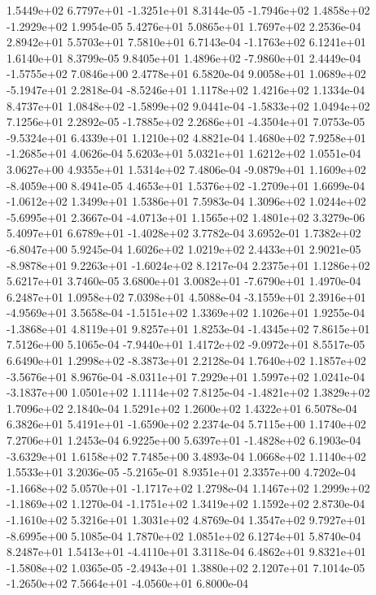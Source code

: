  1.5449e+02  6.7797e+01 -1.3251e+01  8.3144e-05
-1.7946e+02  1.4858e+02 -1.2929e+02  1.9954e-05
5.4276e+01 5.0865e+01 1.7697e+02  2.2536e-04
2.8942e+01 5.5703e+01 7.5810e+01  6.7143e-04
-1.1763e+02  6.1241e+01  1.6140e+01  8.3799e-05
 9.8405e+01  1.4896e+02 -7.9860e+01  2.4449e-04
-1.5755e+02  7.0846e+00  2.4778e+01  6.5820e-04
 9.0058e+01  1.0689e+02 -5.1947e+01  2.2818e-04
-8.5246e+01  1.1178e+02  1.4216e+02  1.1334e-04
 8.4737e+01  1.0848e+02 -1.5899e+02  9.0441e-04
-1.5833e+02  1.0494e+02  7.1256e+01  2.2892e-05
-1.7885e+02  2.2686e+01 -4.3504e+01  7.0753e-05
-9.5324e+01  6.4339e+01  1.1210e+02  4.8821e-04
 1.4680e+02  7.9258e+01 -1.2685e+01  4.0626e-04
5.6203e+01 5.0321e+01 1.6212e+02  1.0551e-04
3.0627e+00 4.9355e+01 1.5314e+02  7.4806e-04
-9.0879e+01  1.1609e+02 -8.4059e+00  8.4941e-05
 4.4653e+01  1.5376e+02 -1.2709e+01  1.6699e-04
-1.0612e+02  1.3499e+01  1.5386e+01  7.5983e-04
 1.3096e+02  1.0244e+02 -5.6995e+01  2.3667e-04
-4.0713e+01  1.1565e+02  1.4801e+02  3.3279e-06
 5.4097e+01  6.6789e+01 -1.4028e+02  3.7782e-04
 3.6952e-01  1.7382e+02 -6.8047e+00  5.9245e-04
1.6026e+02 1.0219e+02 2.4433e+01  2.9021e-05
-8.9878e+01  9.2263e+01 -1.6024e+02  8.1217e-04
2.2375e+01 1.1286e+02 5.6217e+01  3.7460e-05
 3.6800e+01  3.0082e+01 -7.6790e+01  1.4970e-04
6.2487e+01 1.0958e+02 7.0398e+01  4.5088e-04
-3.1559e+01  2.3916e+01 -4.9569e+01  3.5658e-04
-1.5151e+02  1.3369e+02  1.1026e+01  1.9255e-04
-1.3868e+01  4.8119e+01  9.8257e+01  1.8253e-04
-1.4345e+02  7.8615e+01  7.5126e+00  5.1065e-04
-7.9440e+01  1.4172e+02 -9.0972e+01  8.5517e-05
 6.6490e+01  1.2998e+02 -8.3873e+01  2.2128e-04
 1.7640e+02  1.1857e+02 -3.5676e+01  8.9676e-04
-8.0311e+01  7.2929e+01  1.5997e+02  1.0241e-04
-3.1837e+00  1.0501e+02  1.1114e+02  7.8125e-04
-1.4821e+02  1.3829e+02  1.7096e+02  2.1840e-04
1.5291e+02 1.2600e+02 1.4322e+01  6.5078e-04
 6.3826e+01  5.4191e+01 -1.6590e+02  2.2374e-04
5.7115e+00 1.1740e+02 7.2706e+01  1.2453e-04
 6.9225e+00  5.6397e+01 -1.4828e+02  6.1903e-04
-3.6329e+01  1.6158e+02  7.7485e+00  3.4893e-04
1.0668e+02 1.1140e+02 1.5533e+01  3.2036e-05
-5.2165e-01  8.9351e+01  2.3357e+00  4.7202e-04
-1.1668e+02  5.0570e+01 -1.1717e+02  1.2798e-04
 1.1467e+02  1.2999e+02 -1.1869e+02  1.1270e-04
-1.1751e+02  1.3419e+02  1.1592e+02  2.8730e-04
-1.1610e+02  5.3216e+01  1.3031e+02  4.8769e-04
 1.3547e+02  9.7927e+01 -8.6995e+00  5.1085e-04
1.7870e+02 1.0851e+02 6.1274e+01  5.8740e-04
 8.2487e+01  1.5413e+01 -4.4110e+01  3.3118e-04
 6.4862e+01  9.8321e+01 -1.5808e+02  1.0365e-05
-2.4943e+01  1.3880e+02  2.1207e+01  7.1014e-05
-1.2650e+02  7.5664e+01 -4.0560e+01  6.8000e-04
